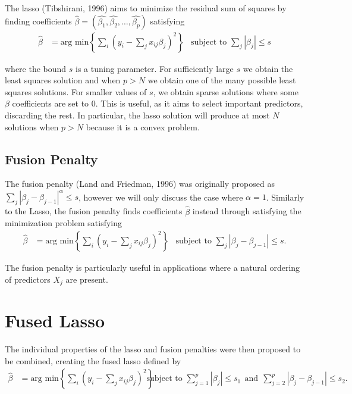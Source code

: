 \documentclass[12pt]{article}
\begin{document}
The lasso (Tibshirani, 1996) aims to minimize the residual sum of squares by finding coefficients $\hat{\beta} = \left(\hat{\beta_1}, \hat{\beta_2}, \dots, \hat{\beta_p}\right)$ satisfying 
\begin{align*}
    \hat{\beta} &= \text{arg min}\left\{\sum_i\left(y_i - \sum_j x_{ij}\beta_j\right)^2\right\} & \text{subject to } \sum_j \left|\beta_j\right| \le s
\end{align*}

\noindent where the bound $s$ is a tuning parameter. For sufficiently large $s$ we obtain the least squares solution and when $p > N$ we obtain one of the many possible least squares solutions. For smaller values of $s$, we obtain sparse solutions where some $\beta$ coefficients are set to 0. This is useful, as it aims to select important predictors, discarding the rest. In particular, the lasso solution will produce at most $N$ solutions when $p > N$ because it is a convex problem. 

\subsection{Fusion Penalty}

The fusion penalty (Land and Friedman, 1996) was originally proposed as $\sum_j |\beta_j - \beta_{j - 1}|^\alpha \le s$, however we will only discuss the case where $\alpha = 1$. Similarly to the Lasso, the fusion penalty finds coefficients $\hat{\beta}$ instead through satisfying the minimization problem satisfying
\begin{align*}
    \hat{\beta} &= \text{arg min}\left\{\sum_i\left(y_i - \sum_j x_{ij}\beta_j\right)^2\right\} & \text{subject to } \sum_j \left|\beta_j - \beta_{j - 1}\right| \le s.
\end{align*}

\noindent The fusion penalty is particularly useful in applications where a natural ordering of predictors $X_j$ are present. 

\section{Fused Lasso}

The individual properties of the lasso and fusion penalties were then proposed to be combined, creating the fused lasso defined by
\begin{align}
    \hat{\beta} &= \text{arg min}\left\{\sum_i\left(y_i - \sum_j x_{ij}\beta_j\right)^2\right\} & \text{subject to } \sum_{j = 1}^{p} \left|\beta_j\right| \le s_1 ~~\text{and}~~ \sum_{j = 2}^{p} \left|\beta_j - \beta_{j - 1}\right| \le s_2.
    \label{eq:fusedlasso}
\end{align}
\end{document}
